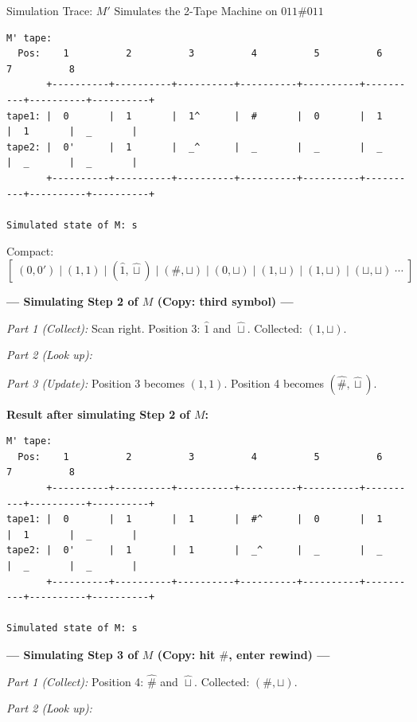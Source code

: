 \begin{examplebox}{{Simulation Trace: $M'$ Simulates the 2-Tape Machine on $011\#011$}}
\begin{lstlisting}
M' tape:
  Pos:    1          2          3          4          5          6          7          8
       +----------+----------+----------+----------+----------+----------+----------+----------+
tape1: |  0       |  1       |  1^      |  #       |  0       |  1       |  1       |  _       |
tape2: |  0'      |  1       |  _^      |  _       |  _       |  _       |  _       |  _       |
       +----------+----------+----------+----------+----------+----------+----------+----------+

Simulated state of M: s
\end{lstlisting}

Compact: $[\;(0, 0')\;|\;(1, 1)\;|\;(\hat{1}, \hat{\sqcup})\;|\;(\#, \sqcup)\;|\;(0, \sqcup)\;|\;(1, \sqcup)\;|\;(1, \sqcup)\;|\;(\sqcup, \sqcup)\;\cdots\;]$

\bigskip
\textbf{--- Simulating Step 2 of $M$ (Copy: third symbol) ---}

\textit{Part 1 (Collect):} Scan right. Position 3: $\hat{1}$ and $\hat{\sqcup}$. Collected: $(1, \sqcup)$.

\textit{Part 2 (Look up):}


\textit{Part 3 (Update):} Position 3 becomes $(1, 1)$. Position 4 becomes $(\hat{\#}, \hat{\sqcup})$.

\textbf{Result after simulating Step 2 of $M$:}

\begin{lstlisting}
M' tape:
  Pos:    1          2          3          4          5          6          7          8
       +----------+----------+----------+----------+----------+----------+----------+----------+
tape1: |  0       |  1       |  1       |  #^      |  0       |  1       |  1       |  _       |
tape2: |  0'      |  1       |  1       |  _^      |  _       |  _       |  _       |  _       |
       +----------+----------+----------+----------+----------+----------+----------+----------+

Simulated state of M: s
\end{lstlisting}

\bigskip
\textbf{--- Simulating Step 3 of $M$ (Copy: hit $\#$, enter rewind) ---}

\textit{Part 1 (Collect):} Position 4: $\hat{\#}$ and $\hat{\sqcup}$. Collected: $(\#, \sqcup)$.

\textit{Part 2 (Look up):}


\end{examplebox}
